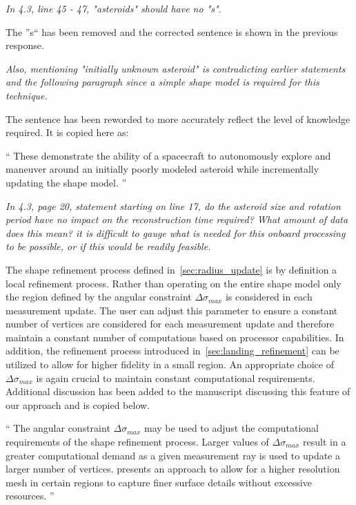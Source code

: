 \documentclass[11pt]{article}
\newenvironment{correction}{\begin{list}{}{\setlength{\leftmargin}{1cm}\setlength{\rightmargin}{1cm}}\vspace{\parsep}\item[]``}{''\end{list}}
\newcommand{\comment}[1]{\item \itshape #1 \normalfont}
\begin{document}
\begin{itemize}
\comment{
In 4.3, line 45 - 47, "asteroids" should have no "s". 
}

The ''s`` has been removed and the corrected sentence is shown in the previous response.

\comment{
Also, mentioning "initially unknown asteroid" is contradicting earlier statements and the following paragraph since a simple shape model is required for this technique.
}

The sentence has been reworded to more accurately reflect the level of knowledge required.
It is copied here as:

\begin{correction}
These demonstrate the ability of a spacecraft to autonomously explore and maneuver around an initially poorly modeled asteroid while incrementally updating the shape model.
\end{correction}

\comment{
In 4.3, page 20, statement starting on line 17, do the asteroid size and rotation period have no impact on the reconstruction time required? 
What amount of data does this mean? 
it is difficult to gauge what is needed for this onboard processing to be possible, or if this would be readily feasible.
}

The shape refinement process defined in~\cref{sec:radius_update} is by definition a local refinement process.
Rather than operating on the entire shape model only the region defined by the angular constraint \( \Delta \sigma_{max}\) is considered in each measurement update. 
The user can adjust this parameter to ensure a constant number of vertices are considered for each measurement update and therefore maintain a constant number of computations based on processor capabilities. 
In addition, the refinement process introduced in~\cref{sec:landing_refinement} can be utilized to allow for higher fidelity in a small region.
An appropriate choice of \( \Delta \sigma_{max} \) is again crucial to maintain constant computational requirements.
Additional discussion has been added to the manuscript discussing this feature of our approach and is copied below.

\begin{correction}
    The angular constraint \( \Delta \sigma_{max} \) may be used to adjust the computational requirements of the shape refinement process.
    Larger values of \( \Delta \sigma_{max} \) result in a greater computational demand as a given measurement ray is used to update a larger number of vertices.
     presents an approach to allow for a higher resolution mesh in certain regions to capture finer surface details without excessive resources. 
\end{correction}


\end{itemize}
\end{document}
